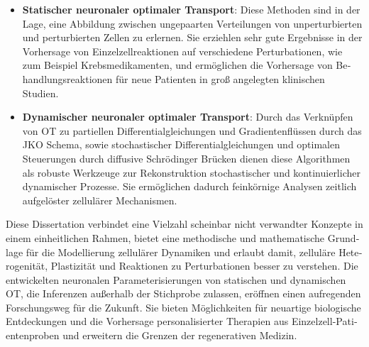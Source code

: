 \begin{otherlanguage}{ngerman}
\begin{itemize}[leftmargin=*]
	\item \textbf{Statischer neuronaler optimaler Transport}: 
	Diese Methoden sind in der Lage, eine Abbildung zwischen ungepaarten Verteilungen von unperturbierten und perturbierten Zellen zu erlernen. Sie erziehlen sehr gute Ergebnisse in der Vorhersage von Einzelzellreaktionen auf verschiedene Perturbationen, wie zum Beispiel Krebsmedikamenten, und erm{\"o}glichen die Vorhersage von Behandlungsreaktionen f{\"u}r neue Patienten in gro{\ss} angelegten klinischen Studien.

	\item \textbf{Dynamischer neuronaler optimaler Transport}: 
	Durch das Verkn{\"u}pfen von OT zu partiellen Differentialgleichungen und Gradientenfl{\"u}ssen durch das \acrfull{JKO} Schema, sowie stochastischer Differentialgleichungen und optimalen Steuerungen durch diffusive Schr{\"o}dinger Br{\"u}cken dienen diese Algorithmen als robuste Werkzeuge zur Rekonstruktion stochastischer und kontinuierlicher dynamischer Prozesse. Sie erm{\"o}glichen dadurch feink{\"o}rnige Analysen zeitlich aufgel{\"o}ster zellul{\"a}rer Mechanismen.
\end{itemize}

Diese Dissertation verbindet eine Vielzahl scheinbar nicht verwandter Konzepte in einem einheitlichen Rahmen, bietet eine methodische und mathematische Grundlage f{\"u}r die Modellierung zellul{\"a}rer Dynamiken und erlaubt damit, zellul{\"a}re Heterogenit{\"a}t, Plastizit{\"a}t und Reaktionen zu Perturbationen besser zu verstehen. Die entwickelten neuronalen Parameterisierungen von statischen und dynamischen OT, die Inferenzen au{\ss}erhalb der Stichprobe zulassen, er{\"o}ffnen einen aufregenden Forschungsweg f{\"u}r die Zukunft. Sie bieten M{\"o}glichkeiten f{\"u}r neuartige biologische Entdeckungen und die Vorhersage personalisierter Therapien aus Einzelzell-Patientenproben und erweitern die Grenzen der regenerativen Medizin.


\end{otherlanguage}

\endgroup

\vfill